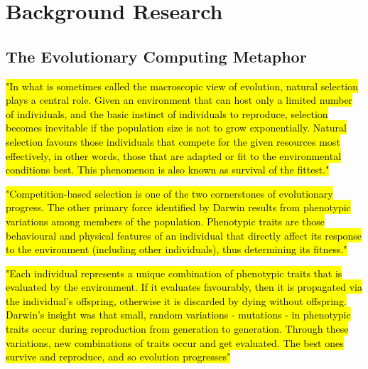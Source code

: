 
\chapter{Background Research} %

\label{Chapter2} %


\section{The Evolutionary Computing Metaphor}

\hl{"In what is sometimes called the macroscopic view of evolution, natural selection plays a central role. Given an environment that can host only a limited number of individuals, and the basic instinct of individuals to reproduce, selection becomes inevitable if the population size is not to grow exponentially. Natural selection favours those individuals that compete for the given resources most effectively, in other words, those that are adapted or fit to the environmental conditions best. This phenomenon is also known as survival of the fittest."} \cite{EibenSmith2003}

\hl{"Competition-based selection is one of the two cornerstones of evolutionary progress. The other primary force identified by Darwin results from phenotypic variations among members of the population. Phenotypic traits are those behavioural and physical features of an individual that directly affect its response to the environment (including other individuals), thus determining its fitness."} \cite{EibenSmith2003}

\hl{"Each individual represents a unique combination of phenotypic traits that is evaluated by the environment. If it evaluates favourably, then it is propagated via the individual's offspring, otherwise it is discarded by dying without offspring. Darwin's insight was that small, random variations - mutations - in phenotypic traits occur during reproduction from generation to generation. Through these variations, new combinations of traits occur and get evaluated. The best ones survive and reproduce, and so evolution progresses"} \cite{EibenSmith2003}

